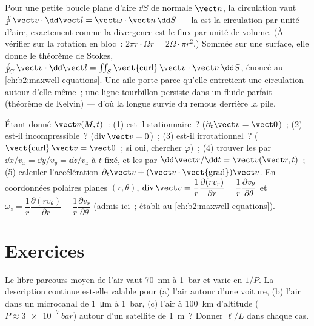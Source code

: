 \begin{remark}\label{rem:b2:fluid-kinematics:stokes}
Pour une petite boucle plane d'aire $\dd S$ de normale $\vect n$, la
circulation vaut $\oint\vect v\cdot\dd\vect l = \vect\omega\cdot\vect n\,\dd S$ ---
la  est la circulation par unité d'aire, exactement comme la
divergence est le flux par unité de volume. (À vérifier sur la rotation en
bloc~: $2\pi r\cdot\Omega r = 2\Omega\cdot\pi r^2$.) Sommée sur une surface,
elle donne le théorème de Stokes, $\oint_C\vect v\cdot\dd\vect l = \iint_S
\operatorname{\vect{curl}}\vect v\cdot\vect n\,\dd S$, énoncé au
\cref{ch:b2:maxwell-equations}. Une aile porte parce qu'elle entretient une
circulation autour d'elle-même~; une ligne tourbillon persiste dans un fluide parfait
(théorème de Kelvin) --- d'où la longue survie du remous derrière la pile.
\end{remark}

\begin{method}\label{met:b2:fluid-kinematics:reading}
Étant donné $\vect v(M, t)$~: (1) est-il stationnaire~? ($\partial_t\vect v = \vect 0$)~; (2)
est-il incompressible~? ($\operatorname{div}\vect v = 0$)~; (3) est-il
irrotationnel~? ($\operatorname{\vect{curl}}\vect v = \vect 0$~; si oui, chercher
$\varphi$)~; (4) trouver les  par $\dd x/v_x = \dd y/v_y = \dd z/
v_z$ à $t$ fixé, et les  par $\dd\vect r/\dd t = \vect v(\vect r,
t)$~; (5) calculer l'accélération $\partial_t\vect v + (\vect v\cdot
\operatorname{\vect{grad}})\vect v$. En coordonnées polaires planes $(r, \theta)$,
$\operatorname{div}\vect v = \dfrac1r\dfrac{\partial(rv_r)}{\partial r} + \dfrac1r
\dfrac{\partial v_\theta}{\partial\theta}$ et $\omega_z = \dfrac1r\dfrac{\partial(rv_\theta)}
{\partial r} - \dfrac1r\dfrac{\partial v_r}{\partial\theta}$ (admis ici~; établi
au \cref{ch:b2:maxwell-equations}).
\end{method}

\section{Exercices}

\begin{exercise}[$\star$]\label{exo:b2:fluid-kinematics:1}
Le libre parcours moyen de l'air vaut \qty{70}{nm} à \qty{1}{bar} et varie en
$1/P$. La description continue est-elle valable pour (a) l'air autour d'une voiture,
(b) l'air dans un microcanal de \qty{1}{\micro m} à \qty{1}{bar}, (c) l'air à
\qty{100}{km} d'altitude ($P \approx \qty{3e-7}{bar}$) autour d'un satellite de
\qty{1}{m}~? Donner $\ell/L$ dans chaque cas.
\end{exercise}

